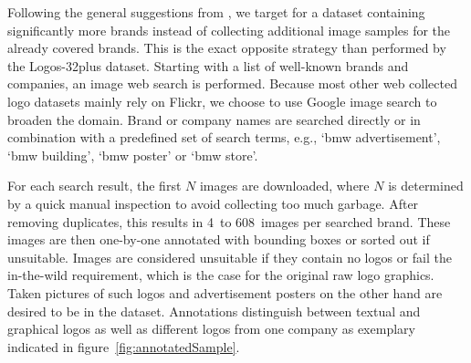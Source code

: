 \documentclass[a4paper,twoside]{article}
\newcommand{\xeg}{e.g.}
\begin{document}
%
Following the general suggestions from \cite{bansal2017}, we target for a dataset containing significantly more brands instead of collecting additional image samples for the already covered brands. This is the exact opposite strategy than performed by the Logos-32plus dataset.
Starting with a list of well-known brands and companies, an image web search is performed. Because most other web collected logo datasets mainly rely on Flickr, we choose to use Google image search to broaden the domain. Brand or company names are searched directly or in combination with a predefined set of search terms, \xeg, `bmw advertisement', `bmw building', `bmw poster' or `bmw store'. 

For each search result, the first $N$ images are downloaded, where $N$ is determined by a quick manual inspection to avoid collecting too much garbage. 
After removing duplicates, this results in 4~to 608~images per searched brand. These images are then one-by-one annotated with bounding boxes or sorted out if unsuitable.
Images are considered unsuitable if they contain no logos or fail the in-the-wild requirement, which is the case for the original raw logo graphics. Taken pictures of such logos and advertisement posters on the other hand are desired to be in the dataset. 
Annotations distinguish between textual and graphical logos as well as different logos from one company as exemplary indicated in figure~\ref{fig:annotatedSample}.
%
\end{document}
